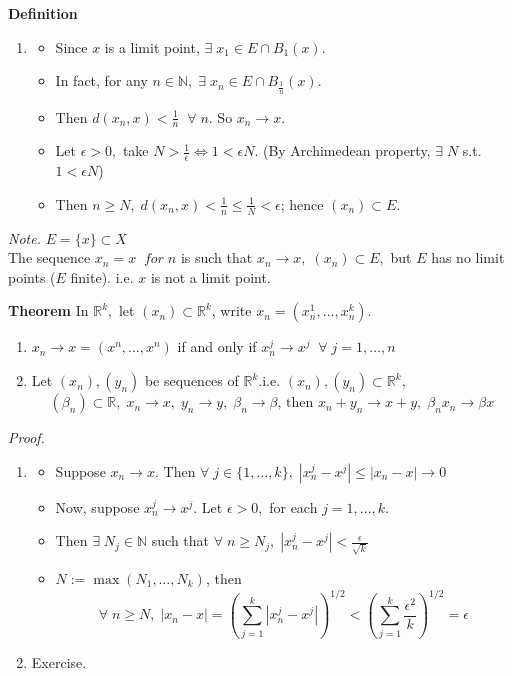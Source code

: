 \documentclass[12pt]{article}
\begin{document}
\begin{block}{\bf Definition}
\begin{enumerate}[label=(\roman*)]
    \item 
    \begin{itemize}
        \item Since $x$ is a limit point, $\exists\; x_1\in E\cap B_1(x)$.
        \item In fact, for any $n\in \mathbb{N},\;\exists\;x_n\in E\cap B_\frac{1}{n} (x).$
        \item Then $d(x_n,x)<\frac{1}{n}\;\;\forall\;n$. So $x_n\to x$.
        \item Let $\epsilon >0,$ take $N>\frac{1}{\epsilon}\Leftrightarrow 1<\epsilon N.$  (By Archimedean property, $\exists\; N$ s.t. $1<\epsilon N$) 
        \item Then $n\ge N,\; d(x_n,x)<\frac{1}{n}\le \frac{1}{N}<\epsilon$; hence $(x_n)\subset E$.
    \end{itemize}
\end{enumerate}

\vspace{1\baselineskip}
{\sl Note.} $E=\{x\}\subset X$\\
The sequence $x_n = x\;\;for\;n$ is such that $x_n\to x,\;(x_n)\subset E,$ but $E$ has no limit points ($E$ finite). i.e. $x$ is not a limit point.
\end{block} 

\newpage
{\bf Theorem} In $\mathbb{R}^k,$ let $(x_n)\subset \mathbb{R}^k$, write $x_n = (x_n^1,\ldots, x_n^k).$
\begin{enumerate}[label=(\roman*)]
    \item $x_n\to x = (x^n,\ldots, x^n)$ if and only if $x_n^j\to x^j\;\;\forall\;j=1,\ldots,n$
    \item Let $(x_n), (y_n)$ be sequences of $\mathbb{R}^k.$\quad i.e. $(x_n),(y_n)\subset \mathbb{R}^k,$
    $$(\beta_n)\subset \mathbb{R},\;x_n\to x,\;y_n\to y,\; \beta_n\to \beta \text{, then }    x_n+y_n \to x+y,\;\beta_n x_n\to \beta x$$
\end{enumerate}
{\sl Proof.}
\begin{enumerate}[label=(\roman*)]
    \item 
    \begin{itemize}
        \item Suppose $x_n\to x.$ Then $\forall\;j\in \{1,\ldots,k\},\; |x_n^j - x^j| \le |x_n-x| \to 0$
        \item Now, suppose $x_n^j\to x^j.$ Let $\epsilon >0,$ for each $j=1,\ldots,k$.
        \item Then $\exists\;N_j\in\mathbb{N}$ such that $\forall\;n\ge N_j,\;|x_n^j-x^j|<\frac{\epsilon}{\sqrt{k}}$
        \item $N:= \max(N_1,\ldots,N_k)$, then
        $$\forall\; n\ge N,\;|x_n-x|=\left(\sum_{j=1}^k |x_n^j - x^j|\right)^{1/2} < \left(\sum_{j=1}^k \frac{\epsilon^2}{k}\right)^{1/2} =\epsilon$$
    \end{itemize}
    \item Exercise.\\
\end{enumerate}
\end{document}
